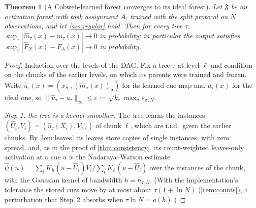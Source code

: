 \documentclass[11pt]{article}
\newtheorem{theorem}{Theorem}
\theoremstyle{definition}
\theoremstyle{remark}
\newcommand{\F}{\mathfrak{F}}
\begin{document}
\begin{theorem}[A Cobweb-learned forest converges to its ideal forest]\label{thm:ideal}
Let $\F$ be an activation forest with task assignment $A$, trained with the split
protocol on $N$ observations, and let \cref{ass:regular} hold.  Then for every tree
$\tau$, $\sup_x|\hat m_\tau(x)-m_\tau(x)|\to0$ in probability; in particular the output
satisfies $\sup_x|\hat F_N(x)-F_A(x)|\to0$ in probability.
\end{theorem}
\begin{proof}
Induction over the levels of the DAG.  Fix a tree $\tau$ at level $\ell$ and condition on
the chunks of the earlier levels, on which its parents were trained and frozen.  Write
$\hat u_\tau(x)=(x_{S_\tau},(\hat m_\sigma(x))_\sigma)$ for its learned cue map and
$u_\tau(x)$ for the ideal one, so $\|\hat u_\tau-u_\tau\|_\infty\le\varepsilon:=
\sqrt{k_\tau}\max_\sigma\varepsilon_{\sigma,N}$.

\emph{Step 1: the tree is a kernel smoother.}  The tree learns the instances
$(\hat U_i,V_i)=(\hat u_\tau(X_i),V_{\tau,i})$ of chunk $\ell$, which are i.i.d.\ given
the earlier chunks.  By \cref{lem:leaves} its leaves store copies of single instances,
with zero spread, and, as in the proof of \cref{thm:consistency}, its count-weighted
leaves-only activation at a cue $u$ is the Nadaraya--Watson estimate
$\hat\psi(u)=\sum_iK_h(u-\hat U_i)V_i/\sum_iK_h(u-\hat U_i)$ over the instances of the
chunk, with the Gaussian kernel of bandwidth $h=h_{\tau,N}$.  (With the implementation's
tolerance the stored cues move by at most about $\tau(1+\ln N)$ (\cref{rem:counts}), a
perturbation that Step~2 absorbs when $\tau\ln N=o(h)$.)


\end{proof}
\end{document}
